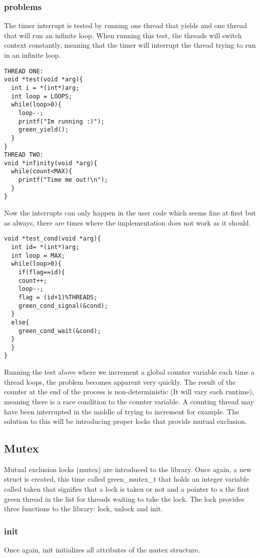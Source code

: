 \documentclass[12pt]{article}
\begin{document}
\subsubsection{problems}
The timer interrupt is tested by running one thread that yields and one thread that will run an infinite loop. When running this test, the threads will switch context constantly, meaning that the timer will interrupt the thread trying to run in an infinite loop. 

\begin{lstlisting}
THREAD ONE:
void *test(void *arg){
  int i = *(int*)arg;
  int loop = LOOPS;
  while(loop>0){
    loop--;
    printf("Im running :)");
    green_yield();
  }
}
THREAD TWO:
void *infinity(void *arg){
  while(count<MAX){
    printf("Time me out!\n");
  }
}
\end{lstlisting}


Now the interrupts can only happen in the user code which seems fine at first but as always, there are times where the implementation does not work as it should.
\begin{lstlisting}
void *test_cond(void *arg){
  int id= *(int*)arg;
  int loop = MAX;
  while(loop>0){
    if(flag==id){
    count++;
    loop--;
    flag = (id+1)%THREADS;
    green_cond_signal(&cond);
  }
  else{
    green_cond_wait(&cond);
  }
  }
}
\end{lstlisting}

Running the test above where we increment a global counter variable each time a thread loops, the problem becomes apparent very quickly. The result of the counter at the end of the process is non-deterministic (It will vary each runtime), meaning there is a race condition to the counter variable. A counting thread may have been interrupted in the middle of trying to increment for example. The solution to this will be introducing proper locks that provide mutual exclusion.

\subsection{Mutex}
Mutual exclusion locks (mutex) are introduced to the library. Once again, a new struct is created, this time called green\_mutex\_t that holds an integer variable called taken that signifies that a lock is taken or not and a pointer to a the first green thread in the list for threads waiting to take the lock. The lock provides three functions to the library: lock, unlock and init.

\subsubsection{init}
Once again, init initializes all attributes of the mutex structure.
\end{document}
